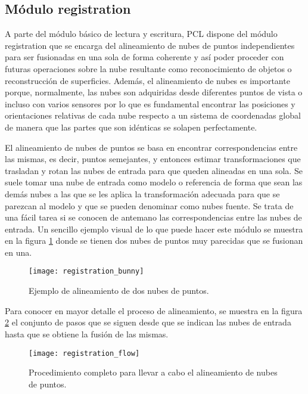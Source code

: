 \subsection{Módulo registration}
A parte del módulo básico de lectura y escritura, PCL dispone del módulo registration\cite{registration} que se encarga del alineamiento de nubes de puntos independientes para ser fusionadas en una sola de forma coherente y así poder proceder con futuras operaciones sobre la nube resultante como reconocimiento de objetos o reconstrucción de superficies. Además, el alineamiento de nubes es importante porque, normalmente, las nubes son adquiridas desde diferentes puntos de vista o incluso con varios sensores por lo que es fundamental encontrar las posiciones y orientaciones relativas de cada nube respecto a un sistema de coordenadas global de manera que las partes que son idénticas se solapen perfectamente. 

El alineamiento de nubes de puntos se basa en encontrar correspondencias entre las mismas, es decir, puntos semejantes, y entonces estimar transformaciones que trasladan y rotan las nubes de entrada para que queden alineadas en una sola. Se suele tomar una nube de entrada como modelo o referencia de forma que sean las demás nubes a las que se les aplica la transformación adecuada para que se parezcan al modelo y que se pueden denominar como nubes fuente. Se trata de una fácil tarea si se conocen de antemano las correspondencias entre las nubes de entrada. Un sencillo ejemplo visual de lo que puede hacer este módulo se muestra en la figura \ref{fig:registration_bunny} donde se tienen dos nubes de puntos muy parecidas que se fusionan en una. 


\begin{figure}
\centering
\texttt{[image: registration\_bunny]}
\caption{Ejemplo de alineamiento de dos nubes de puntos.}\label{fig:registration_bunny}
\end{figure}


Para conocer en mayor detalle el proceso de alineamiento, se muestra en la figura \ref{fig:registration_flow} el conjunto de pasos que se siguen desde que se indican las nubes de entrada hasta que se obtiene la fusión de las mismas.

\begin{figure}
\centering
\texttt{[image: registration\_flow]}
\caption{Procedimiento completo para llevar a cabo el alineamiento de nubes de puntos.}\label{fig:registration_flow}
\end{figure}

